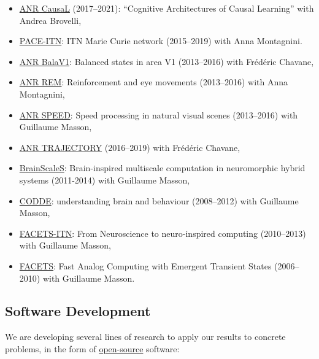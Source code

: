 \documentclass[10pt,english,a4paper,oneside]{article}%
\begin{document}
\begin{itemize}
\begin{itemize}
	 \item \href{https://laurentperrinet.github.io/grant/anr-causal/}{ANR CausaL} (2017--2021): ``Cognitive Architectures of  Causal  Learning'' with Andrea Brovelli,
	\item \href{https://laurentperrinet.github.io/grant/pace-itn/}{PACE-ITN}: ITN Marie Curie network (2015--2019) with Anna Montagnini.
	\item \href{https://laurentperrinet.github.io/grant/anr-bala-v1/}{ANR BalaV1}: Balanced states in area V1 (2013--2016) with Frédéric Chavane,
	\item \href{https://laurentperrinet.github.io/grant/anr-rem/}{ANR REM}: Reinforcement and eye movements (2013--2016) with Anna Montagnini,
	\item \href{https://laurentperrinet.github.io/grant/anr-speed/}{ANR SPEED}: Speed processing in natural visual scenes (2013--2016)  with Guillaume Masson,
	\item \href{https://laurentperrinet.github.io/grant/anr-trajectory/}{ANR TRAJECTORY} (2016--2019) with Frédéric Chavane,
	\item  \href{https://laurentperrinet.github.io/grant/brain-scales/}{BrainScaleS}: Brain-inspired multiscale computation in neuromorphic hybrid systems (2011-2014) with Guillaume Masson,
	\item \href{https://laurentperrinet.github.io/grant/codde/}{CODDE}: understanding brain and behaviour (2008--2012) with Guillaume Masson,
	\item \href{https://laurentperrinet.github.io/grant/facets-itn/}{FACETS-ITN}: From Neuroscience to neuro-inspired computing (2010--2013) with Guillaume Masson,
	\item \href{https://laurentperrinet.github.io/grant/facets/}{FACETS}: Fast Analog Computing with Emergent Transient States (2006--2010) with Guillaume Masson.
\end{itemize}
\end{itemize}


\subsection{Software Development} %

We are developing several lines of research to apply our results to concrete problems, in the form of \href{https://laurentperrinet.github.io/project/open-science/}{open-source} software:
\end{document}
